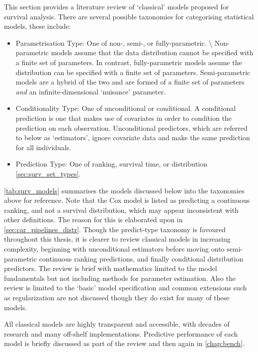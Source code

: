 \documentclass[
  letterpaper,
]{scrbook}
\providecommand{\tightlist}{%
  \setlength{\itemsep}{0pt}\setlength{\parskip}{0pt}}\usepackage{longtable,booktabs,array}
\theoremstyle{plain}
\theoremstyle{definition}
\theoremstyle{remark}
\begin{document}
This section provides a literature review of `classical' models proposed
for survival analysis. There are several possible taxonomies for
categorising statistical models, these include:

\begin{itemize}
\tightlist
\item
  Parametrisation Type: One of non-, semi-, or fully-parametric.
  \textbackslash{} Non-parametric models assume that the data
  distribution cannot be specified with a finite set of parameters. In
  contrast, fully-parametric models assume the distribution can be
  specified with a finite set of parameters. Semi-parametric models are
  a hybrid of the two and are formed of a finite set of parameters
  \emph{and} an infinite-dimensional `nuisance' parameter.
\item
  Conditionality Type: One of unconditional or conditional. A
  conditional prediction is one that makes use of covariates in order to
  condition the prediction on each observation. Unconditional
  predictors, which are referred to below as `estimators', ignore
  covariate data and make the same prediction for all individuals.
\item
  Prediction Type: One of ranking, survival time, or distribution
  \ref{sec:surv_set_types}.
\end{itemize}

\ref{tab:surv_models} summarises the models discussed below into the
taxonomies above for reference. Note that the Cox model is listed as
predicting a continuous ranking, and not a survival distribution, which
may appear inconsistent with other definitions. The reason for this is
elaborated upon in \ref{sec:car_pipelines_distr}. Though the
predict-type taxonomy is favoured throughout this thesis, it is clearer
to review classical models in increasing complexity, beginning with
unconditional estimators before moving onto semi-parametric continuous
ranking predictions, and finally conditional distribution predictors.
The review is brief with mathematics limited to the model fundamentals
but not including methods for parameter estimation. Also the review is
limited to the `basic' model specification and common extensions such as
regularization are not discussed though they do exist for many of these
models.

All classical models are highly transparent and accessible, with decades
of research and many off-shelf implementations. Predictive performance
of each model is briefly discussed as part of the review and then again
in \ref{chap:bench}.
\end{document}
